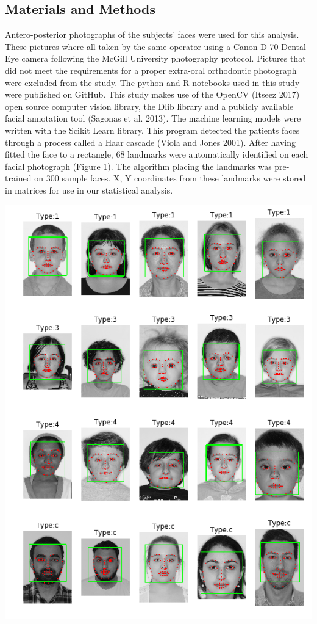 \documentclass{article}
\begin{document}
\begin{multicols}{2}
\section{Materials and Methods}

Antero-posterior photographs of the subjects' faces were used for this
analysis. These pictures where all taken by the same operator using a
Canon D 70 Dental Eye camera following the McGill University photography
protocol. Pictures that did not meet the requirements for a proper
extra-oral orthodontic photograph were excluded from the study. The
python and R notebooks used in this study were published on GitHub. This
study makes use of the OpenCV (Itseez 2017) open source computer vision
library, the Dlib library and a publicly available facial annotation
tool (Sagonas et al. 2013). The machine learning models were written
with the Scikit Learn library. This program detected the patients faces
through a process called a Haar cascade (Viola and Jones 2001). After
having fitted the face to a rectangle, 68 landmarks were automatically
identified on each facial photograph (Figure 1). The algorithm placing
the landmarks was pre-trained on 300 sample faces. X, Y coordinates from
these landmarks were stored in matrices for use in our statistical
analysis.

\begin{center}
\includegraphics[width=\linewidth]{figures/processing.png}
\end{center}


\end{multicols}
\end{document}
